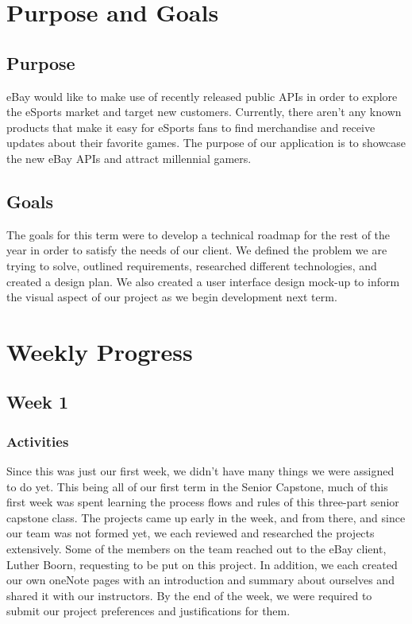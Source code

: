 \documentclass[onecolumn, draftclsnofoot,10pt, compsoc]{IEEEtran}
\begin{document}
\newpage
{}
\tableofcontents
\clearpage


\section{Purpose and Goals}

\subsection{Purpose}
eBay would like to make use of recently released public APIs in order to explore the eSports market and target new customers. 
Currently, there aren’t any known products that make it easy for eSports fans to find merchandise and receive updates about their favorite games. 
The purpose of our application is to showcase the new eBay APIs and attract millennial gamers. 

\subsection{Goals}
The goals for this term were to develop a technical roadmap for the rest of the year in order to satisfy the needs of our client. 
We defined the problem we are trying to solve, outlined requirements, researched different technologies, and created a design plan. 
We also created a user interface design mock-up to inform the visual aspect of our project as we begin development next term. 

\section{Weekly Progress}

\subsection{Week 1}

\subsubsection{Activities}
Since this was just our first week, we didn’t have many things we were assigned to do yet. This being all of our first term in the Senior Capstone, much of this first week was spent learning the process flows and rules of this three-part senior capstone class. The projects came up early in the week, and from there, and since our team was not formed yet, we each reviewed and researched the projects extensively. Some of the members on the team reached out to the eBay client, Luther Boorn, requesting to be put on this project. In addition, we each created our own oneNote pages with an introduction and summary about ourselves and shared it with our instructors. By the end of the week, we were required to submit our project preferences and justifications for them. 
\end{document}
